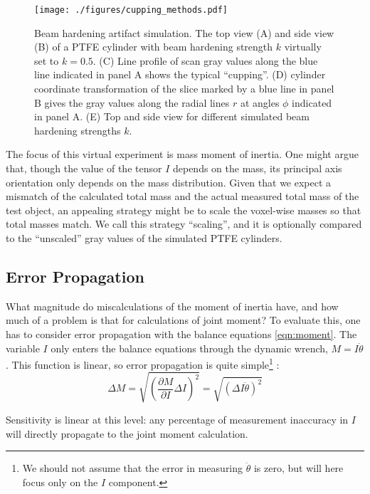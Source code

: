 \begin{figure}[htbp]
\centering
\texttt{[image: ./figures/cupping\_methods.pdf]}
\caption{\label{fig:cupping_methods}Beam hardening artifact simulation. The top view (A) and side view (B) of a PTFE cylinder with beam hardening strength \(k\) virtually set to \(k=0.5\). (C) Line profile of scan gray values along the blue line indicated in panel A shows the typical ``cupping''. (D) cylinder coordinate transformation of the slice marked by a blue line in panel B gives the gray values along the radial lines \(r\) at angles \(\phi\) indicated in panel A. (E) Top and side view for different simulated beam hardening strengths \(k\).}
\end{figure}


The focus of this virtual experiment is mass moment of inertia.
One might argue that, though the value of the tensor \(I\) depends on the mass, its principal axis orientation only depends on the mass distribution.
Given that we expect a mismatch of the calculated total mass and the actual measured total mass of the test object, an appealing strategy might be to scale the voxel-wise masses so that total masses match.
We call this strategy ``scaling'', and it is optionally compared to the ``unscaled'' gray values of the simulated PTFE cylinders.



\subsection{Error Propagation}
\label{sec:orge2f9318}
What magnitude do miscalculations of the moment of inertia have, and how much of a problem is that for calculations of joint moment?
To evaluate this, one has to consider error propagation with the balance equations \eqref{eqn:moment}.
The variable \(I\) only enters the balance equations through the dynamic wrench, \(M = I \ddot\theta\).
This function is linear, so error propagation is quite simple\footnote{We should not assume that the error in measuring \(\ddot \theta\) is zero, but will here focus only on the \(I\) component.} \citep{Hughes2010,Normann2016}:
\begin{equation}\label{eqn:moment}
\Delta M = \sqrt{\left(\frac{\partial M}{\partial I}\Delta I\right)^2} = \sqrt{\left(\Delta I \ddot\theta\right)^2}
\end{equation}

Sensitivity is linear at this level: any percentage of measurement inaccuracy in \(I\) will directly propagate to the joint moment calculation.



